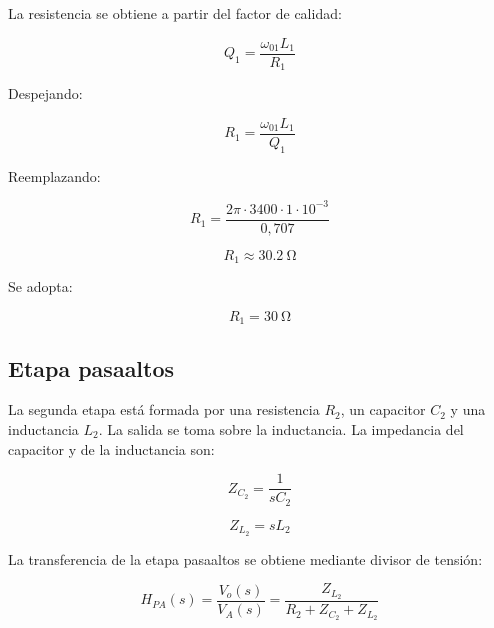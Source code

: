 \documentclass[12pt,a4paper]{article}
\begin{document}
La resistencia se obtiene a partir del factor de calidad:

\begin{equation}
    Q_1=\frac{\omega_{01}L_1}{R_1}
    \label{eq:q1_resistencia}
\end{equation}

Despejando:

\begin{equation}
    R_1=\frac{\omega_{01}L_1}{Q_1}
    \label{eq:r1_calculo}
\end{equation}

Reemplazando:

\begin{equation}
    R_1=
    \frac{2\pi\cdot 3400\cdot 1\cdot 10^{-3}}
    {0{,}707}
    \label{eq:r1_reemplazo}
\end{equation}

\begin{equation}
    \boxed{
    R_1\approx \SI{30.2}{\ohm}
    }
    \label{eq:r1_resultado}
\end{equation}

Se adopta:

\begin{equation}
    \boxed{
    R_1=\SI{30}{\ohm}
    }
    \label{eq:r1_comercial}
\end{equation}

\subsection{Etapa pasaaltos}

La segunda etapa está formada por una resistencia $R_2$, un capacitor $C_2$ y una inductancia $L_2$. La salida se toma sobre la inductancia. La impedancia del capacitor y de la inductancia son:

\begin{equation}
    Z_{C_2}=\frac{1}{sC_2}
    \label{eq:zc2}
\end{equation}

\begin{equation}
    Z_{L_2}=sL_2
    \label{eq:zl2}
\end{equation}

La transferencia de la etapa pasaaltos se obtiene mediante divisor de tensión:

\begin{equation}
    H_{PA}(s)=\frac{V_o(s)}{V_A(s)}
    =
    \frac{Z_{L_2}}{R_2+Z_{C_2}+Z_{L_2}}
    \label{eq:divisor_pa}
\end{equation}
\end{document}

